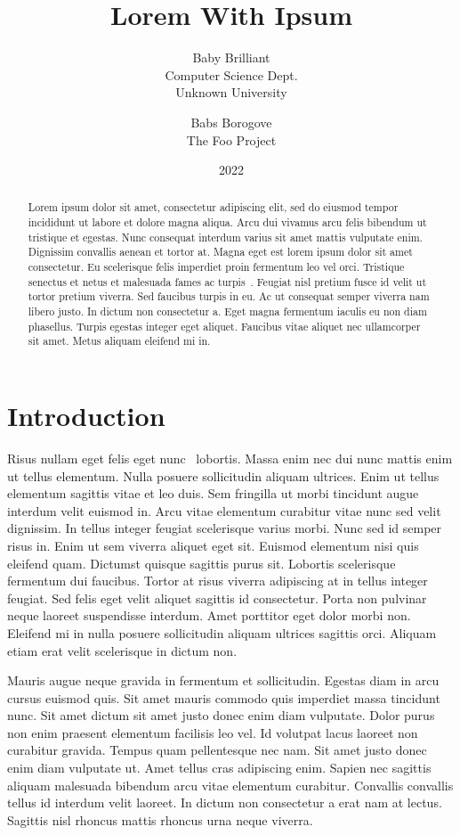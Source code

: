\documentclass{rust-edu-workshop}
\title{Lorem With Ipsum}
\date{2022}
\author{%
  Baby Brilliant\\
  Computer Science Dept.\\
  Unknown University\\
  \email{babybrilliant@example.com}
  \and
  Babs Borogove\\
  The Foo Project\\
  \email{babs.borogove@example.com}
}
\begin{document}
\maketitle               

\begin{abstract}

  Lorem ipsum dolor sit amet, consectetur adipiscing elit,
  sed do eiusmod tempor incididunt ut labore et dolore magna
  aliqua. Arcu dui vivamus arcu felis bibendum ut tristique
  et egestas. Nunc consequat interdum varius sit amet mattis
  vulputate enim. Dignissim convallis aenean et tortor
  at. Magna eget est lorem ipsum dolor sit amet
  consectetur. Eu scelerisque felis imperdiet proin
  fermentum leo vel orci. Tristique senectus et netus et
  malesuada fames ac turpis~\cite{bibref1}. Feugiat nisl
  pretium fusce id velit ut tortor pretium viverra. Sed
  faucibus turpis in eu. Ac ut consequat semper viverra nam
  libero justo. In dictum non consectetur a. Eget magna
  fermentum iaculis eu non diam phasellus. Turpis egestas
  integer eget aliquet. Faucibus vitae aliquet nec
  ullamcorper sit amet. Metus aliquam eleifend mi in.

\end{abstract}

\section{Introduction}

  Risus nullam eget felis eget nunc~\cite{bibref2}
  lobortis. Massa enim nec dui nunc mattis enim ut tellus
  elementum. Nulla posuere sollicitudin aliquam
  ultrices. Enim ut tellus elementum sagittis vitae et leo
  duis. Sem fringilla ut morbi tincidunt augue interdum
  velit euismod in. Arcu vitae elementum curabitur vitae
  nunc sed velit dignissim. In tellus integer feugiat
  scelerisque varius morbi. Nunc sed id semper risus
  in. Enim ut sem viverra aliquet eget sit. Euismod
  elementum nisi quis eleifend quam. Dictumst quisque
  sagittis purus sit. Lobortis scelerisque fermentum dui
  faucibus. Tortor at risus viverra adipiscing at in tellus
  integer feugiat. Sed felis eget velit aliquet sagittis id
  consectetur. Porta non pulvinar neque laoreet suspendisse
  interdum. Amet porttitor eget dolor morbi non. Eleifend mi
  in nulla posuere sollicitudin aliquam ultrices sagittis
  orci. Aliquam etiam erat velit scelerisque in dictum non.

  Mauris augue neque gravida in fermentum et
  sollicitudin. Egestas diam in arcu cursus euismod
  quis. Sit amet mauris commodo quis imperdiet massa
  tincidunt nunc. Sit amet dictum sit amet justo donec enim
  diam vulputate. Dolor purus non enim praesent elementum
  facilisis leo vel. Id volutpat lacus laoreet non curabitur
  gravida. Tempus quam pellentesque nec nam. Sit amet justo
  donec enim diam vulputate ut. Amet tellus cras adipiscing
  enim. Sapien nec sagittis aliquam malesuada bibendum arcu
  vitae elementum curabitur. Convallis convallis tellus id
  interdum velit laoreet. In dictum non consectetur a erat
  nam at lectus. Sagittis nisl rhoncus mattis rhoncus urna
  neque viverra.
\end{document}
